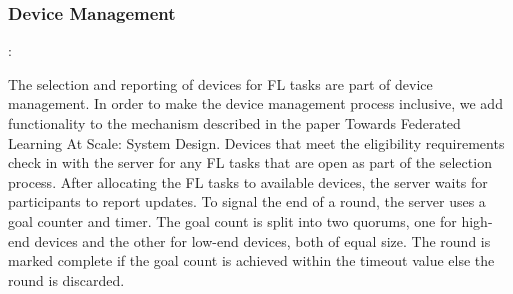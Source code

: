         \subsubsection{Device Management}:
        
            The selection and reporting of devices for FL tasks are part of device management. In order to make the device management process inclusive, we add functionality to the mechanism described in the paper Towards Federated Learning At Scale: System Design. Devices that meet the eligibility requirements check in with the server for any FL tasks that are open as part of the selection process. After allocating the FL tasks to available devices, the server waits for participants to report updates. To signal the end of a round, the server uses a goal counter and timer. The goal count is split into two quorums, one for high-end devices and the other for low-end devices, both of equal size. The round is marked complete if the goal count is achieved within the timeout value else the round is discarded.